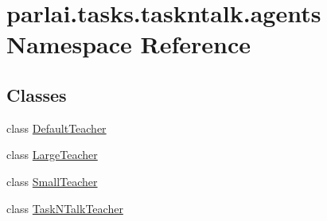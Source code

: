 \hypertarget{namespaceparlai_1_1tasks_1_1taskntalk_1_1agents}{}\section{parlai.\+tasks.\+taskntalk.\+agents Namespace Reference}
\label{namespaceparlai_1_1tasks_1_1taskntalk_1_1agents}
\subsection*{Classes}
\begin{DoxyCompactItemize}
\item 
class \hyperlink{classparlai_1_1tasks_1_1taskntalk_1_1agents_1_1DefaultTeacher}{Default\+Teacher}
\item 
class \hyperlink{classparlai_1_1tasks_1_1taskntalk_1_1agents_1_1LargeTeacher}{Large\+Teacher}
\item 
class \hyperlink{classparlai_1_1tasks_1_1taskntalk_1_1agents_1_1SmallTeacher}{Small\+Teacher}
\item 
class \hyperlink{classparlai_1_1tasks_1_1taskntalk_1_1agents_1_1TaskNTalkTeacher}{Task\+N\+Talk\+Teacher}
\end{DoxyCompactItemize}
